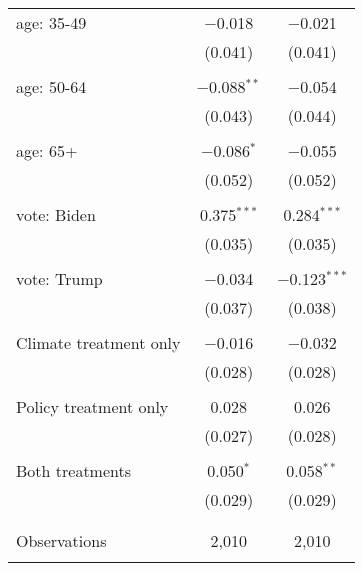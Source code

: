 \begin{tabular}{@{\extracolsep{5pt}}lcc}
 age: 35-49 & $-$0.018 & $-$0.021 \\ 
  & (0.041) & (0.041) \\ 
  & & \\ 
 age: 50-64 & $-$0.088$^{**}$ & $-$0.054 \\ 
  & (0.043) & (0.044) \\ 
  & & \\ 
 age: 65+ & $-$0.086$^{*}$ & $-$0.055 \\ 
  & (0.052) & (0.052) \\ 
  & & \\ 
 vote: Biden & 0.375$^{***}$ & 0.284$^{***}$ \\ 
  & (0.035) & (0.035) \\ 
  & & \\ 
 vote: Trump & $-$0.034 & $-$0.123$^{***}$ \\ 
  & (0.037) & (0.038) \\ 
  & & \\ 
 Climate treatment only & $-$0.016 & $-$0.032 \\ 
  & (0.028) & (0.028) \\ 
  & & \\ 
 Policy treatment only & 0.028 & 0.026 \\ 
  & (0.027) & (0.028) \\ 
  & & \\ 
 Both treatments & 0.050$^{*}$ & 0.058$^{**}$ \\ 
  & (0.029) & (0.029) \\ 
  & & \\ 
\hline \\[-1.8ex] 

Observations & 2,010 & 2,010 \\ 
\hline 
\hline \\[-1.8ex] 
\end{tabular} 